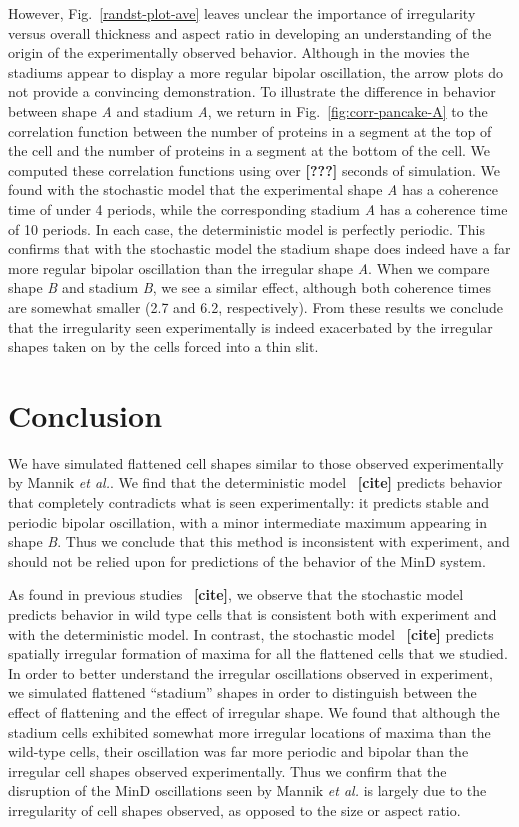 \documentclass[letterpaper,twocolumn,amsmath,amssymb,pre]{revtex4-1}
\newcommand{\red}[1]{{\bf \color{red} #1}}
\newcommand{\fixme}[1]{\red{[#1]}}
\begin{document}
However, Fig.~\ref{randst-plot-ave} leaves unclear the importance of
irregularity versus overall thickness and aspect ratio in developing
an understanding of the origin of the experimentally observed
behavior.  Although in the movies the stadiums appear to display a
more regular bipolar oscillation, the arrow plots do not provide a
convincing demonstration.  To illustrate the difference in behavior
between shape \emph{A} and stadium \emph{A}, we return in
Fig.~\ref{fig:corr-pancake-A} to the correlation function between the
number of proteins in a segment at the top of the cell and the number
of proteins in a segment at the bottom of the cell.  We computed these
correlation functions using over \fixme{???} seconds of simulation.
We found with the stochastic model that the experimental shape
\emph{A} has a coherence time of under 4 periods, while the
corresponding stadium \emph{A} has a coherence time of 10 periods.  In
each case, the deterministic model is perfectly periodic. This
confirms that with the stochastic model the stadium shape does indeed
have a far more regular bipolar oscillation than the irregular shape
\emph{A}.  When we compare shape \emph{B} and stadium \emph{B}, we see
a similar effect, although both coherence times are somewhat smaller
(2.7 and 6.2, respectively).  From these results we conclude that the
irregularity seen experimentally is indeed exacerbated by the
irregular shapes taken on by the cells forced into a thin slit.

\section{Conclusion}
We have simulated flattened cell shapes similar to those observed
experimentally by Mannik \emph{et al.}.  We find that the
deterministic model~\fixme{cite} predicts behavior that completely
contradicts what is seen experimentally: it predicts stable and
periodic bipolar oscillation, with a minor intermediate maximum
appearing in shape \emph{B}.  Thus we conclude that this method is
inconsistent with experiment, and should not be relied upon for
predictions of the behavior of the MinD system.

As found in previous studies~\fixme{cite}, we observe that the
stochastic model predicts behavior in wild type cells that is
consistent both with experiment and with the deterministic model.  In
contrast, the stochastic model~\fixme{cite} predicts spatially
irregular formation of maxima for all the flattened cells that we
studied.  In order to better understand the irregular oscillations
observed in experiment, we simulated flattened ``stadium'' shapes in
order to distinguish between the effect of flattening and the effect
of irregular shape.  We found that although the stadium cells
exhibited somewhat more irregular locations of maxima than the
wild-type cells, their oscillation was far more periodic and bipolar
than the irregular cell shapes observed experimentally.  Thus we
confirm that the disruption of the MinD oscillations seen by Mannik
\emph{et al.} is largely due to the irregularity of cell shapes
observed, as opposed to the size or aspect ratio.
\end{document}
